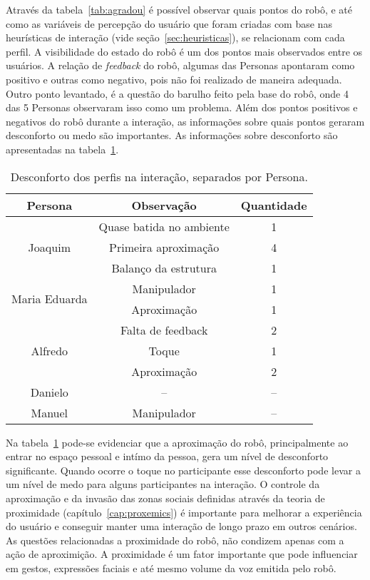Através da tabela~\ref{tab:agradou} é possível observar quais pontos do robô, e até como as variáveis de percepção do usuário que foram criadas com base nas heurísticas de interação (vide seção~\ref{sec:heuristicas}), se relacionam com cada perfil. A visibilidade do estado do robô é um dos pontos mais observados entre os usuários. A relação de \emph{feedback} do robô, algumas das Personas apontaram como positivo e outras como negativo, pois não foi realizado de maneira adequada. Outro ponto levantado, é a questão do barulho feito pela base do robô, onde 4 das 5 Personas observaram isso como um problema. Além dos pontos positivos e negativos do robô durante a interação, as informações sobre quais pontos geraram desconforto ou medo são importantes. As informações sobre desconforto são apresentadas na tabela~\ref{tab:desconforto}.

\begin{table}[!ht]
	\caption{Desconforto dos perfis na interação, separados por Persona.}
	\label{tab:desconforto}
	\centering
	\begin{tabular}{c | c | c }
        \hline
        Persona & Observação & Quantidade \\
        \hline
        \multirow{3}{*}{Joaquim} & Quase batida no ambiente & 1 \\
        \hhline{~--}
        & Primeira aproximação & 4 \\
        \hhline{~--}
        & Balanço da estrutura & 1 \\
        \hline
        \multirow{2}{*}{Maria Eduarda} & Manipulador & 1 \\
        \hhline{~--}
        & Aproximação & 1 \\
        \hline
        \multirow{3}{*}{Alfredo} & Falta de feedback & 2 \\
        \hhline{~--}
        & Toque & 1 \\
        \hhline{~--}
        & Aproximação & 2 \\
        \hline
        Danielo & -- & -- \\
        \hline
        Manuel & Manipulador & -- \\
        \hline
    \end{tabular}
\end{table}

Na tabela~\ref{tab:desconforto} pode-se evidenciar que a aproximação do robô, principalmente ao entrar no espaço pessoal e intímo da pessoa, gera um nível de desconforto significante. Quando ocorre o toque no participante esse desconforto pode levar a um nível de medo para alguns participantes na interação. O controle da aproximação e da invasão das zonas sociais definidas através da teoria de proximidade (capítulo~\ref{cap:proxemics}) é importante para melhorar a experiência do usuário e conseguir manter uma interação de longo prazo em outros cenários. As questões relacionadas a proximidade do robô, não condizem apenas com a ação de aproximição. A proximidade é um fator importante que pode influenciar em gestos, expressões faciais e até mesmo volume da voz emitida pelo robô.

